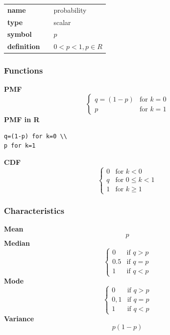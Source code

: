 \noindent\begin{tabular}{p{2cm}cl}
\textbf{name} & & probability \\
\textbf{type} & & scalar \\
\textbf{symbol} & & $p$  \\
\textbf{definition} & & $0<p<1, p \in  R$
\end{tabular}
\subsubsection*{Functions}

\smallskip \noindent \hspace{.2cm} \textbf{PMF} 
\begin{equation*}\begin{cases}
    q=(1-p) & \text{for }k=0 \\ p & \text{for }k=1
    \end{cases}\end{equation*}
\smallskip \noindent \hspace{.2cm} \textbf{PMF in R}  
\begin{verbatim}q=(1-p) for k=0 \\
p for k=1\end{verbatim}
\smallskip \noindent \hspace{.2cm} \textbf{CDF} 
\begin{equation*}\begin{cases}
    0 & \text{for }k<0 \\ q & \text{for }0\leq k<1 \\ 1 & \text{for }k\geq 1
    \end{cases}\end{equation*}
\smallskip
\subsubsection*{Characteristics}
\smallskip \noindent \hspace{.2cm} \textbf{Mean} 
\begin{equation*}p\end{equation*}
\smallskip \noindent \hspace{.2cm} \textbf{Median} 
\begin{equation*}\begin{cases}
0 & \text{if } q > p\\
0.5 & \text{if } q=p\\
1 & \text{if } q<p
\end{cases}\end{equation*}
\smallskip \noindent \hspace{.2cm} \textbf{Mode} 
\begin{equation*}\begin{cases}
0 & \text{if } q > p\\
0, 1 & \text{if } q=p\\
1 & \text{if } q < p
\end{cases}\end{equation*}
\smallskip \noindent \hspace{.2cm} \textbf{Variance} 
\begin{equation*}p(1-p)\end{equation*}
\smallskip
